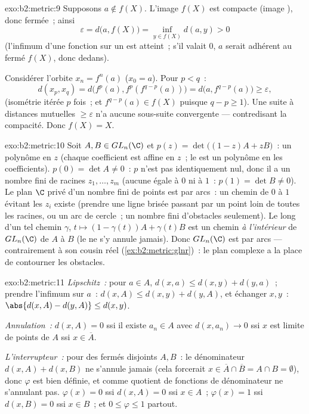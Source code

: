\begin{solution}{exo:b2:metric:9}
Supposons $a \notin f(X)$. L'image $f(X)$ est compacte (image
), donc fermée~; ainsi
\[
\varepsilon = d\bigl(a, f(X)\bigr)
= \inf_{y \in f(X)} d(a, y) > 0
\]
(l'infimum d'une fonction  sur un  est atteint~; s'il
valait $0$, $a$ serait adhérent au fermé $f(X)$, donc dedans).

Considérer l'orbite $x_n = f^n(a)$ ($x_0 = a$). Pour $p < q$~:
\[
d(x_p, x_q) = d\bigl(f^p(a), f^p(f^{q-p}(a))\bigr)
= d\bigl(a, f^{q-p}(a)\bigr) \geq \varepsilon,
\]
(isométrie itérée $p$ fois~; et $f^{q-p}(a) \in f(X)$ puisque $q - p
\geq 1$). Une suite à distances mutuelles $\geq \varepsilon$ n'a
aucune sous-suite convergente --- contredisant la compacité. Donc
$f(X) = X$.
\end{solution}

\begin{solution}{exo:b2:metric:10}
Soit $A, B \in GL_n(\C)$ et $p(z) = \det\bigl((1-z)A + zB\bigr)$~: un
polynôme en $z$ (chaque coefficient est affine en $z$~; le
 est un polynôme en les coefficients). $p(0) = \det A \neq
0$~: $p$ n'est pas identiquement nul, donc il a un nombre fini de
racines $z_1, \dots, z_m$ (aucune égale à $0$ ni à $1$~: $p(1) = \det
B \neq 0$). Le plan $\C$ privé d'un nombre fini de points est 
par arcs~: un chemin de $0$ à $1$ évitant les $z_i$ existe (prendre
une ligne brisée passant par un point loin de toutes les racines, ou
un arc de cercle~; un nombre fini d'obstacles seulement). Le long
d'un tel chemin $\gamma$, $t \mapsto (1 - \gamma(t))A + \gamma(t)B$
est un chemin  \emph{à l'intérieur} de $GL_n(\C)$ de $A$ à $B$
(le  ne s'y annule jamais). Donc $GL_n(\C)$ est 
par arcs --- contrairement à son cousin réel
(\cref{ex:b2:metric:glnr})~: le plan complexe a la place de
contourner les obstacles.
\end{solution}

\begin{solution}{exo:b2:metric:11}
\emph{Lipschitz~:} pour $a \in A$, $d(x, a) \leq d(x, y) + d(y,
a)$~; prendre l'infimum sur $a$~: $d(x, A) \leq d(x, y) + d(y, A)$,
et échanger $x, y$~: $\abs{d(x,A) - d(y,A)} \leq d(x,y)$.

\emph{Annulation~:} $d(x, A) = 0$ ssi il existe $a_n \in A$ avec
$d(x, a_n) \to 0$ ssi $x$ est limite de points de $A$ ssi $x \in
\overline A$.

\emph{L'interrupteur~:} pour des fermés disjoints $A, B$~: le
dénominateur $d(x,A) + d(x,B)$ ne s'annule jamais (cela forcerait $x
\in \overline A \cap \overline B = A \cap B = \emptyset$), donc
$\varphi$ est bien définie, et  comme quotient de fonctions
 de dénominateur ne s'annulant pas. $\varphi(x) = 0$ ssi
$d(x, A) = 0$ ssi $x \in A$~; $\varphi(x) = 1$ ssi $d(x, B) = 0$ ssi
$x \in B$~; et $0 \leq \varphi \leq 1$ partout.
\end{solution}

